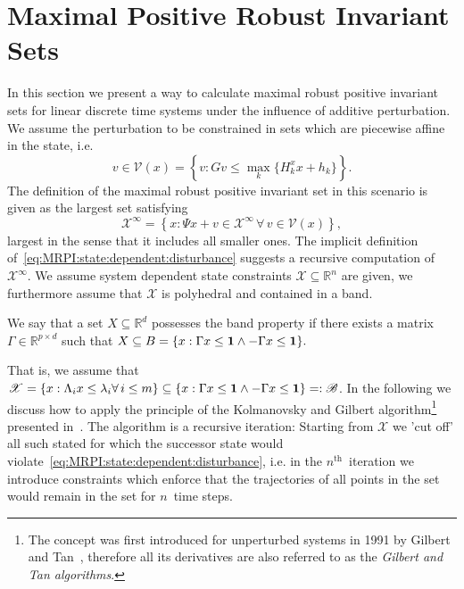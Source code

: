 \section{Maximal Positive Robust Invariant Sets}\label{sec:parametrised:MRPI:set}
In this section we present a way to calculate maximal robust positive invariant sets for
linear discrete time systems under the influence of additive perturbation.
%
We assume the perturbation to be constrained in sets which are piecewise affine in
the state, i.e.
%
\begin{equation}\label{eq:definition:PWA:uncertainty}
v\in \mathcal V(x) = \left\{v: Gv\leq\max_k\{H_k^x x + h_k\}\right\}.
\end{equation}
%
The definition of the maximal robust positive invariant set in this scenario is given as
the largest set satisfying
%
\begin{equation}\label{eq:MRPI:state:dependent:disturbance}
	\mathcal X^\infty = \left\{x: \Psi x + v \in\mathcal X^\infty\,\forall\, v\in\mathcal V(x)\right\},
\end{equation}
%
largest in the sense that it includes all smaller ones.
%
The implicit definition of~\eqref{eq:MRPI:state:dependent:disturbance} suggests a recursive 
computation of $\mathcal X^\infty$.
%
We assume system dependent state constraints $\mathscr X\subseteq\mathbb R^n$ are given,
we furthermore assume that $\mathscr X$ is polyhedral and contained in a band.
%
\begin{defn}
We say that a set $X\subseteq\mathbb R^d$ possesses the band property if there exists a 
matrix~$\Gamma\in\mathbb R^{p\times d}$ such that $X\subseteq B = \{x:\Gamma x\leq {\bf{1}}\wedge
-\Gamma x\leq{\bf{1}}\}.$
\end{defn}
%
That is, we assume that $\mathscr X= \{x:\Lambda_i x \leq \lambda_i \forall\, i\leq m\}\subseteq\{x:\Gamma x\leq{\bf{1}}\wedge
-\Gamma x\leq{\bf{1}}\}=:\mathscr B$.
%
In the following we discuss how to apply the principle of the Kolmanovsky and Gilbert 
algorithm\footnote{The concept was first introduced for 
unperturbed systems in 1991 by Gilbert and Tan~\cite{Gilbert:1991}, therefore all its derivatives 
are also referred to as the \emph{Gilbert and Tan algorithms}.} 
presented in~\cite{Kolmanovsky:1995}.
%
The algorithm is a recursive iteration: Starting from $\mathscr X$ we 'cut off' all such stated 
for which the successor state would violate~\eqref{eq:MRPI:state:dependent:disturbance}, i.e.
in the $n^\text{th}$~iteration we introduce constraints which enforce that the trajectories
of all points in the set would remain in the set for $n$~time steps.
